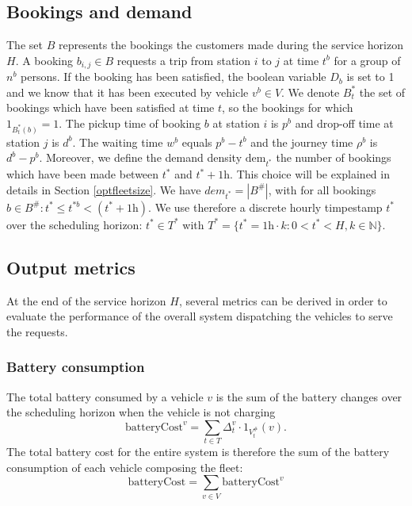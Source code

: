 \documentclass[12pt,a4paper]{article}
\begin{document}
\subsection{Bookings and demand}\label{bookings}
The set $B$ represents the bookings the customers made during the service horizon $H$. A booking $b_{i,j} \in B$ requests a trip from station $i$ to $j$ at time $t^{b}$ for a group of $n^{b}$ persons. If the booking has been satisfied, the boolean variable $D_{b}$ is set to 1 and we know that it has been executed by vehicle $v^{b} \in V$. We denote $B^{*}_{t}$ the set of bookings which have been satisfied at time $t$, so the bookings for which $1_{B^{*}_{t}(b)} = 1$.  The pickup time of booking $b$ at station $i$ is $p^{b}$ and drop-off time at station $j$ is $d^{b}$. The waiting time $w^{b}$ equals $p^{b} - t^{b}$ and the journey time $\rho^{b}$ is $d^{b} - p^{b}$. Moreover, we define the demand density $\text{dem}_{t^{*}}$ the number of bookings which have been made between $t^{*}$ and $t^{*} + 1\text{h}$. This choice will be explained in details in Section \ref{optfleetsize}. We have $dem_{t^{*}} = |B^{\#}|$, with for all bookings $b \in B^{\#}: t^{*} \leq t^{*b} < (t^{*}+1\text{h})$. We use therefore a discrete hourly timpestamp $t^{*}$ over the scheduling horizon: $t^{*} \in T^{*}$ with $T^{*} = \{t^{*} = 1\text{h} \cdot k: 0 < t^{*} < H, k \in \mathbb{N}\}$.

\subsection{Output metrics}\label{metrics}
At the end of the service horizon $H$, several metrics can be derived in order to evaluate the performance of the overall system dispatching the vehicles to serve the requests. 

\subsubsection{Battery consumption}
The total battery consumed by a vehicle $v$ is the sum of the battery changes over the scheduling horizon when the vehicle is not charging
$$\text{batteryCost}^{v} = \sum_{t \in T}\Delta^{v}_{t} \cdot 1_{V^{\#}_{t}}(v) .$$
The total battery cost for the entire system is therefore the sum of the battery consumption of each vehicle composing the fleet:
$$\text{batteryCost} = \sum_{v \in V}\text{batteryCost}^{v}$$
\end{document}
